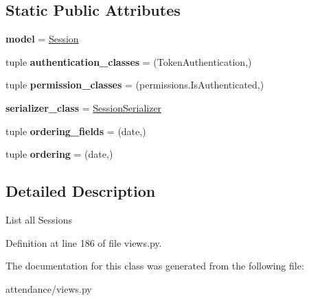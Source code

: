 \subsection*{Static Public Attributes}
\begin{DoxyCompactItemize}
\item 
\hypertarget{classattendance_1_1views_1_1_session_list_aed6aa100a4427952f786416433ad9235}{}\label{classattendance_1_1views_1_1_session_list_aed6aa100a4427952f786416433ad9235} 
{\bfseries model} = \hyperlink{classattendance_1_1models_1_1_session}{Session}
\item 
\hypertarget{classattendance_1_1views_1_1_session_list_a1170049b426064999b116885526708c8}{}\label{classattendance_1_1views_1_1_session_list_a1170049b426064999b116885526708c8} 
tuple {\bfseries authentication\+\_\+classes} = (Token\+Authentication,)
\item 
\hypertarget{classattendance_1_1views_1_1_session_list_a01c1ae4888f2029c30917e4447c41ed3}{}\label{classattendance_1_1views_1_1_session_list_a01c1ae4888f2029c30917e4447c41ed3} 
tuple {\bfseries permission\+\_\+classes} = (permissions.\+Is\+Authenticated,)
\item 
\hypertarget{classattendance_1_1views_1_1_session_list_a9d02059dc93bb04b75e5d02fe60629d3}{}\label{classattendance_1_1views_1_1_session_list_a9d02059dc93bb04b75e5d02fe60629d3} 
{\bfseries serializer\+\_\+class} = \hyperlink{classattendance_1_1serializers_1_1_session_serializer}{Session\+Serializer}
\item 
\hypertarget{classattendance_1_1views_1_1_session_list_af39685257deefa6a10ea1996ea098124}{}\label{classattendance_1_1views_1_1_session_list_af39685257deefa6a10ea1996ea098124} 
tuple {\bfseries ordering\+\_\+fields} = (\textquotesingle{}date\textquotesingle{},)
\item 
\hypertarget{classattendance_1_1views_1_1_session_list_a345bde090c6f171cec0350be6916271d}{}\label{classattendance_1_1views_1_1_session_list_a345bde090c6f171cec0350be6916271d} 
tuple {\bfseries ordering} = (\textquotesingle{}date\textquotesingle{},)
\end{DoxyCompactItemize}


\subsection{Detailed Description}
\begin{DoxyVerb}List all Sessions
\end{DoxyVerb}
 

Definition at line 186 of file views.\+py.



The documentation for this class was generated from the following file\+:\begin{DoxyCompactItemize}
\item 
attendance/views.\+py\end{DoxyCompactItemize}
